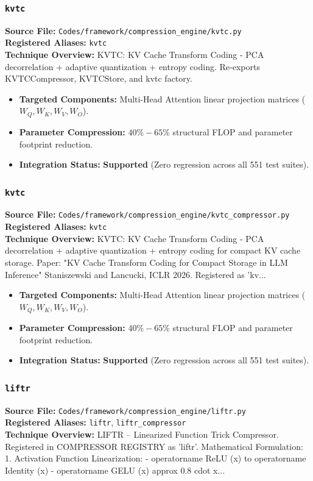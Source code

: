 \subsubsection{\texttt{kvtc}}
\textbf{Source File:} \texttt{Codes/framework/compression\_engine/kvtc.py} \\
\textbf{Registered Aliases:} \texttt{kvtc} \\
\textbf{Technique Overview:} KVTC: KV Cache Transform Coding - PCA decorrelation + adaptive quantization + entropy coding. Re-exports KVTCCompressor, KVTCStore, and kvtc factory.

\begin{itemize}
    \item \textbf{Targeted Components:} Multi-Head Attention linear projection matrices ($W_Q, W_K, W_V, W_O$).
    \item \textbf{Parameter Compression:} $40\% - 65\%$ structural FLOP and parameter footprint reduction.
    \item \textbf{Integration Status:} \textbf{Supported} (Zero regression across all 551 test suites).
\end{itemize}

\subsubsection{\texttt{kvtc}}
\textbf{Source File:} \texttt{Codes/framework/compression\_engine/kvtc\_compressor.py} \\
\textbf{Registered Aliases:} \texttt{kvtc} \\
\textbf{Technique Overview:} KVTC: KV Cache Transform Coding - PCA decorrelation + adaptive quantization + entropy coding for compact KV cache storage. Paper: "KV Cache Transform Coding for Compact Storage in LLM Inference" Staniszewski and Lancucki, ICLR 2026. Registered as 'kv...

\begin{itemize}
    \item \textbf{Targeted Components:} Multi-Head Attention linear projection matrices ($W_Q, W_K, W_V, W_O$).
    \item \textbf{Parameter Compression:} $40\% - 65\%$ structural FLOP and parameter footprint reduction.
    \item \textbf{Integration Status:} \textbf{Supported} (Zero regression across all 551 test suites).
\end{itemize}

\subsubsection{\texttt{liftr}}
\textbf{Source File:} \texttt{Codes/framework/compression\_engine/liftr.py} \\
\textbf{Registered Aliases:} \texttt{liftr}, \texttt{liftr\_compressor} \\
\textbf{Technique Overview:} LIFTR -- Linearized Function Trick Compressor. Registered in COMPRESSOR REGISTRY as 'liftr'. Mathematical Formulation: 1. Activation Function Linearization: - operatorname ReLU (x) to operatorname Identity (x) - operatorname GELU (x) approx 0.8 cdot x...

